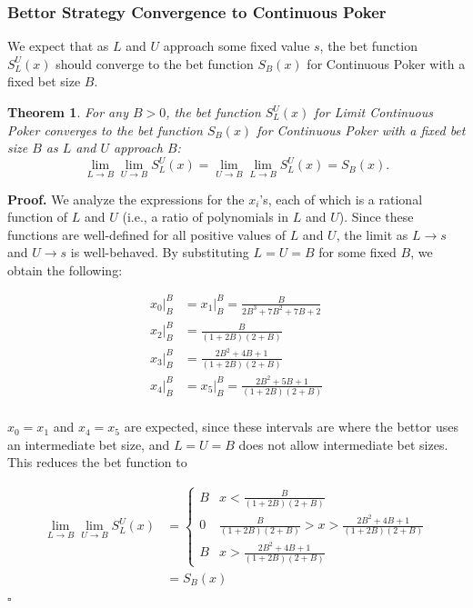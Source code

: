 \documentclass[a4paper,12pt]{article}
\theoremstyle{plain}
\newtheorem{theorem}{Theorem}[section]
\theoremstyle{definition}
\newenvironment{customproof}[1][Proof]{\noindent\textbf{#1.} }{\hfill$\square$\vspace{1em}}
\begin{document}
\subsubsection{Bettor Strategy Convergence to Continuous Poker}
We expect that as $L$ and $U$ approach some fixed value $s$, the bet function $S_L^U(x)$ should converge to the bet function $S_B(x)$ for Continuous Poker with a fixed bet size $B$. 

\begin{theorem}
	 For any $B > 0$, the bet function $S_L^U(x)$ for Limit Continuous Poker converges to the bet function $S_B(x)$ for Continuous Poker with a fixed bet size $B$ as $L$ and $U$ approach $B$:
\[
\lim_{L \to B} \lim_{U \to B} S_L^U(x) = \lim_{U \to B} \lim_{L \to B} S_L^U(x) = S_B(x).
\]
\end{theorem}

\begin{customproof}
We analyze the expressions for the $x_i$'s, each of which is a rational function of $L$ and $U$ (i.e., a ratio of polynomials in $L$ and $U$). Since these functions are well-defined for all positive values of $L$ and $U$, the limit as $L \to s$ and $U \to s$ is well-behaved. By substituting $L = U = B$ for some fixed $B$, we obtain the following:

\begin{align*}
    x_0|_B^B & = x_1|_B^B = \frac{B}{2 B^3+7 B^2+7 B+2} \\
    x_2|_B^B & = \frac{B}{(1+2B)(2+B)} \\
    x_3|_B^B & = \frac{2 B^2+4 B+1}{(1+2B)(2+B)} \\
    x_4|_B^B & = x_5|_B^B = \frac{2 B^2+5 B+1}{(1+2B)(2+B)} \\
\end{align*}

$x_0 = x_1$ and $x_4 = x_5$ are expected, since these intervals are where the bettor uses an intermediate bet size, and $L=U=B$ does not allow intermediate bet sizes. This reduces the bet function to 

\begin{align*}
    \lim_{L \to B} \lim_{U \to B} S_L^U(x) & = \begin{cases}
    B & x < \frac{B}{(1+2B)(2+B)}\\
    0 & \frac{B}{(1+2B)(2+B)} > x > \frac{2 B^2+4 B+1}{(1+2B)(2+B)}\\
    B & x > \frac{2 B^2+4 B+1}{(1+2B)(2+B)}
    \end{cases}\\
    &= S_B(x)
\end{align*}
\end{customproof}
\end{document}
